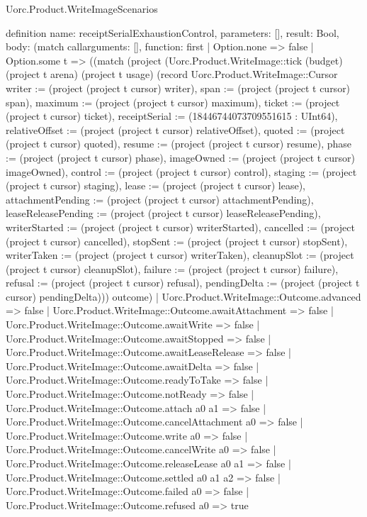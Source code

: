 \begin{lexlean}{Uorc.Product.WriteImageScenarios}
\begin{semanticmodule}
definition{
  name: receiptSerialExhaustionControl,
  parameters: [],
  result: Bool,
  body: (match call{arguments: [], function: first}
    | Option.none => false
    | Option.some t => ((match (project (Uorc.Product.WriteImage::tick (budget) (project t arena) (project t usage) (record Uorc.Product.WriteImage::Cursor {writer := (project (project t cursor) writer), span := (project (project t cursor) span), maximum := (project (project t cursor) maximum), ticket := (project (project t cursor) ticket), receiptSerial := (18446744073709551615 : UInt64), relativeOffset := (project (project t cursor) relativeOffset), quoted := (project (project t cursor) quoted), resume := (project (project t cursor) resume), phase := (project (project t cursor) phase), imageOwned := (project (project t cursor) imageOwned), control := (project (project t cursor) control), staging := (project (project t cursor) staging), lease := (project (project t cursor) lease), attachmentPending := (project (project t cursor) attachmentPending), leaseReleasePending := (project (project t cursor) leaseReleasePending), writerStarted := (project (project t cursor) writerStarted), cancelled := (project (project t cursor) cancelled), stopSent := (project (project t cursor) stopSent), writerTaken := (project (project t cursor) writerTaken), cleanupSlot := (project (project t cursor) cleanupSlot), failure := (project (project t cursor) failure), refusal := (project (project t cursor) refusal), pendingDelta := (project (project t cursor) pendingDelta)})) outcome)
      | Uorc.Product.WriteImage::Outcome.advanced => false
      | Uorc.Product.WriteImage::Outcome.awaitAttachment => false
      | Uorc.Product.WriteImage::Outcome.awaitWrite => false
      | Uorc.Product.WriteImage::Outcome.awaitStopped => false
      | Uorc.Product.WriteImage::Outcome.awaitLeaseRelease => false
      | Uorc.Product.WriteImage::Outcome.awaitDelta => false
      | Uorc.Product.WriteImage::Outcome.readyToTake => false
      | Uorc.Product.WriteImage::Outcome.notReady => false
      | Uorc.Product.WriteImage::Outcome.attach a0 a1 => false
      | Uorc.Product.WriteImage::Outcome.cancelAttachment a0 => false
      | Uorc.Product.WriteImage::Outcome.write a0 => false
      | Uorc.Product.WriteImage::Outcome.cancelWrite a0 => false
      | Uorc.Product.WriteImage::Outcome.releaseLease a0 a1 => false
      | Uorc.Product.WriteImage::Outcome.settled a0 a1 a2 => false
      | Uorc.Product.WriteImage::Outcome.failed a0 => false
      | Uorc.Product.WriteImage::Outcome.refused a0 => true
}
\end{semanticmodule}
\end{lexlean}
